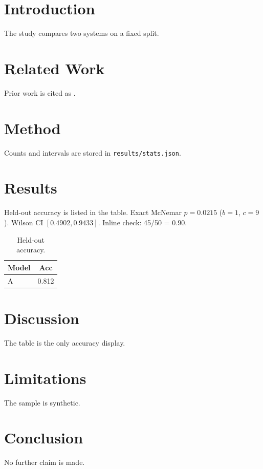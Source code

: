 \documentclass{article}
\begin{document}
\begin{abstract}
Synthetic submission used only as a mechanical-check fixture.
\end{abstract}
\section{Introduction}
The study compares two systems on a fixed split.
\section{Related Work}
Prior work is cited as \cite{vaswani2017}.
\section{Method}
Counts and intervals are stored in \texttt{results/stats.json}.

\section{Results}
Held-out accuracy is listed in the table.
Exact McNemar $p=0.0215$ ($b=1$, $c=9$).
Wilson CI $[0.4902, 0.9433]$.
Inline check: 45/50 = 0.90.

\begin{table}
\caption{Held-out accuracy.}
\label{tab:acc}
\begin{tabular}{lc}
\toprule
Model & Acc \\
\midrule
A & 0.812 \\
\bottomrule
\end{tabular}
\end{table}
\section{Discussion}
The table is the only accuracy display.
\section{Limitations}
The sample is synthetic.
\section{Conclusion}
No further claim is made.
\end{document}
